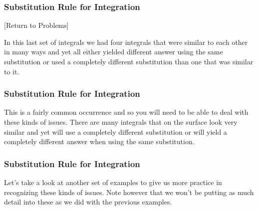 \documentclass{beamer}
\begin{document}
\begin{frame}
	\frametitle{Substitution Rule for Integration}
	\large                                          
[Return to Problems]
 
In this last set of integrals we had four integrals that were similar to each other in many ways and yet all either yielded different answer using the same substitution or used a completely different substitution than one that was similar to it. 
\end{frame}
\begin{frame}
	\frametitle{Substitution Rule for Integration}
	\large
This is a fairly common occurrence and so you will need to be able to deal with these kinds of issues.  There are many integrals that on the surface look very similar and yet will use a completely different substitution or will yield a completely different answer when using the same substitution.
\end{frame}
\begin{frame}
	\frametitle{Substitution Rule for Integration}
	\large
Let’s take a look at another set of examples to give us more practice in recognizing these kinds of issues.  Note however that we won’t be putting as much detail into these as we did with the previous examples.
\end{frame}
\end{document}

